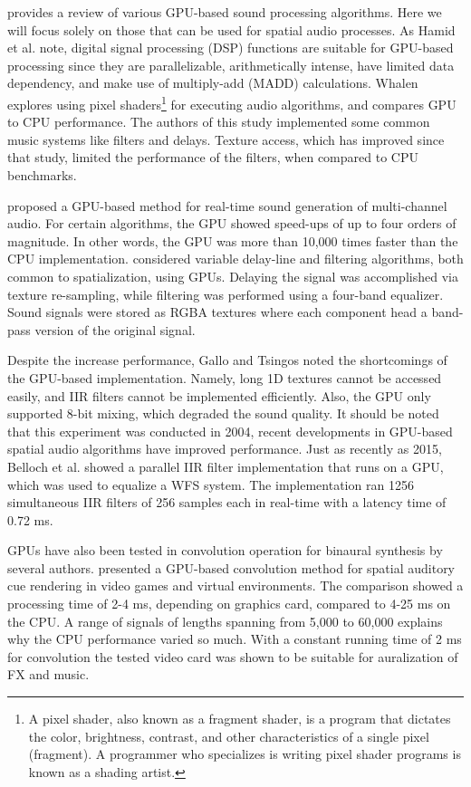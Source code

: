 \cite{hamid2009review} provides a review of various GPU-based sound processing algorithms. Here we will focus solely on those that can be used for spatial audio processes. As Hamid et al. note, digital signal processing (DSP) functions are suitable for GPU-based processing since they are parallelizable, arithmetically intense, have limited data dependency, and make use of multiply-add (MADD) calculations. Whalen \cite{whalen2005audio} explores using pixel shaders\footnote{A pixel shader, also known as a fragment shader, is a program that dictates the color, brightness, contrast, and other characteristics of a single pixel (fragment). A programmer who specializes is writing pixel shader programs is known as a shading artist.} for executing audio algorithms, and compares GPU to CPU performance. The authors of this study implemented some common music systems like filters and delays. Texture access, which has improved since that study, limited the performance of the filters, when compared to CPU benchmarks. 

\cite{trebien2008real} proposed a GPU-based method for real-time sound generation of multi-channel audio. For certain algorithms, the GPU showed speed-ups of up to four orders of magnitude. In other words, the GPU was more than 10,000 times faster than the CPU implementation. \cite{gallo2004efficient} considered variable delay-line and filtering algorithms, both common to spatialization, using GPUs. Delaying the signal was accomplished via texture re-sampling, while filtering was performed using a four-band equalizer. Sound signals were stored as RGBA textures where each component head a band-pass version of the original signal. 

Despite the increase performance, Gallo and Tsingos noted the shortcomings of the GPU-based implementation. Namely, long 1D textures cannot be accessed easily, and IIR filters cannot be implemented efficiently. Also, the GPU only supported 8-bit mixing, which degraded the sound quality. It should be noted that this experiment was conducted in 2004, recent developments in GPU-based spatial audio algorithms have improved performance. Just as recently as 2015, Belloch et al. \cite{belloch2014multi} showed a parallel IIR filter implementation that runs on a GPU, which was used to equalize a WFS system. The implementation ran 1256 simultaneous IIR filters of 256 samples each in real-time with a latency time of 0.72 ms.  

GPUs have also been tested in convolution operation for binaural synthesis by several authors. \cite{cowan2009real} presented a GPU-based convolution method for spatial auditory cue rendering in video games and virtual environments. The comparison showed a processing time of 2-4 ms, depending on graphics card, compared to 4-25 ms on the CPU. A range of signals of lengths spanning from 5,000 to 60,000 explains why the CPU performance varied so much. With a constant running time of 2 ms for convolution the tested video card was shown to be suitable for auralization of FX and music. 

